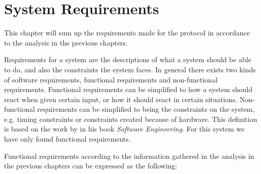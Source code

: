 \chapter{System Requirements}\label{requirements}
This chapter will sum up the requirements made for the protocol in accordance to the analysis in the previous chapters.

Requirements for a system are the descriptions of what a system should be able to do, and also the constraints the system faces.
In general there exists two kinds of software requirements, functional requirements and non-functional requirements. 
Functional requirements can be simplified to how a system should react when given certain input, or how it should react in certain situations.
Non-functional requirements can be simplified to being the constraints on the system, e.g. timing constraints or constraints created because of hardware.
This definition is based on the work by \citet[see][chapter 4]{SEBook} in his book \textit{Software Engineering}.
For this system we have only found functional requirements.

Functional requirements according to the information gathered in the analysis in the previous chapters can be expressed as the following: 


